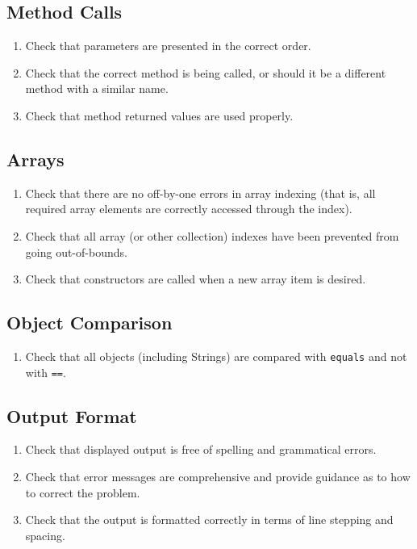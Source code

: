\documentclass[a4paper,11pt]{report} %
\begin{document}
		\subsection*{Method Calls}\begin{enumerate}[resume]
			\item Check that parameters are presented in the correct order.
			\item Check that the correct method is being called, or should it be a different method with a similar name.
			\item Check that method returned values are used properly.
		\end{enumerate}
		
		\subsection*{Arrays}\begin{enumerate}[resume]
			\item Check that there are no off-by-one errors in array indexing (that is, all required array elements are correctly accessed through the index).
			\item Check that all array (or other collection) indexes have been prevented from going out-of-bounds.
			\item Check that constructors are called when a new array item is desired.
		\end{enumerate}
		
		\subsection*{Object Comparison}\begin{enumerate}[resume]
			\item Check that all objects (including Strings) are compared with \texttt{equals} and not with \texttt{==}.
		\end{enumerate}
		
		\subsection*{Output Format}\begin{enumerate}[resume]
			\item Check that displayed output is free of spelling and grammatical errors.
			\item Check that error messages are comprehensive and provide guidance as to how to correct the problem.
			\item Check that the output is formatted correctly in terms of line stepping and spacing.
		\end{enumerate}
		
\end{document}
